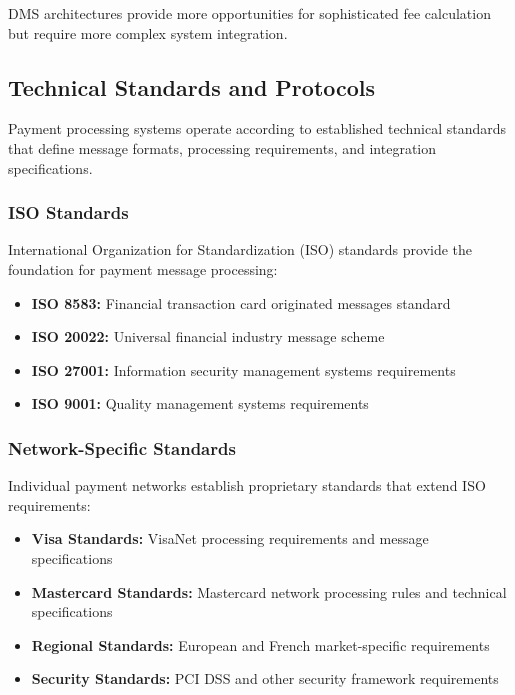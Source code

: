 DMS architectures provide more opportunities for sophisticated fee calculation but require more complex system integration.

\subsection{Technical Standards and Protocols}

Payment processing systems operate according to established technical standards that define message formats, processing requirements, and integration specifications.

\subsubsection{ISO Standards}

International Organization for Standardization (ISO) standards provide the foundation for payment message processing:

\begin{itemize}
    \item \textbf{ISO 8583:} Financial transaction card originated messages standard
    \item \textbf{ISO 20022:} Universal financial industry message scheme
    \item \textbf{ISO 27001:} Information security management systems requirements
    \item \textbf{ISO 9001:} Quality management systems requirements
\end{itemize}

\subsubsection{Network-Specific Standards}

Individual payment networks establish proprietary standards that extend ISO requirements:

\begin{itemize}
    \item \textbf{Visa Standards:} VisaNet processing requirements and message specifications
    \item \textbf{Mastercard Standards:} Mastercard network processing rules and technical specifications
    \item \textbf{Regional Standards:} European and French market-specific requirements
    \item \textbf{Security Standards:} PCI DSS and other security framework requirements
\end{itemize}

